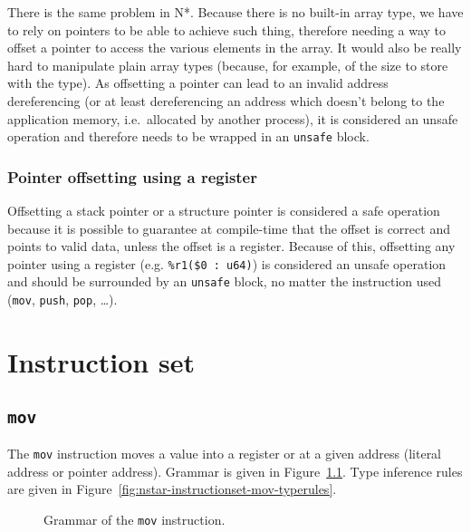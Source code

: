 There is the same problem in N*.
Because there is no built-in array type, we have to rely on pointers to be able to achieve such thing, therefore needing a way to offset a pointer to access the various elements in the array.
It would also be really hard to manipulate plain array types (because, for example, of the size to store with the type).
As offsetting a pointer can lead to an invalid address dereferencing (or at least dereferencing an address which doesn't belong to the application memory, i.e.\ allocated by another process), it is considered an unsafe operation and therefore needs to be wrapped in an \texttt{unsafe} block.

\subsection{Pointer offsetting using a register}\label{subsec:nstar-common-unsafe-ptroffsetreg}

Offsetting a stack pointer or a structure pointer is considered a safe operation because it is possible to guarantee at compile-time that the offset is correct and points to valid data, unless the offset is a register.
Because of this, offsetting any pointer using a register (e.g. \texttt{\%r1(\$0 : u64)}) is considered an unsafe operation and should be surrounded by an \texttt{unsafe} block, no matter the instruction used (\texttt{mov}, \texttt{push}, \texttt{pop}, \ldots).

\chapter{Instruction set}\label{chap:nstar-instructionset}

\section{\texttt{mov}}\label{sec:nstar-instructionset-mov}

The \texttt{mov} instruction moves a value into a register or at a given address (literal address or pointer address).
Grammar is given in Figure~\ref{fig:nstar-instructionset-mov-grammar}.
Type inference rules are given in Figure~\ref{fig:nstar-instructionset-mov-typerules}.

\begin{figure}[H]
  \centering
  \caption{Grammar of the \texttt{mov} instruction.}
  \label{fig:nstar-instructionset-mov-grammar}
\end{figure}

